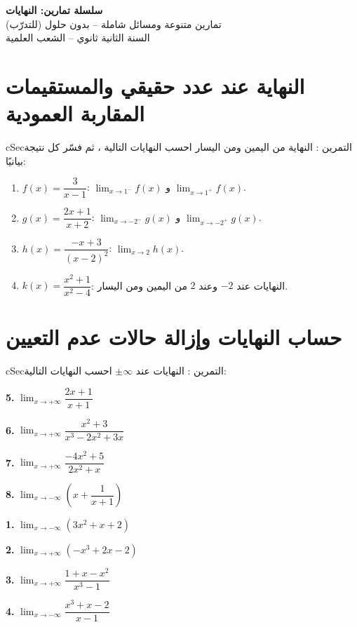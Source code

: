 \documentclass[12pt,a4paper]{article}
\newenvironment{BOX}[2]{\begin{otherlanguage}{english}\begin{arbox}{#1}{#2}}{\end{arbox}\end{otherlanguage}}
\newcounter{exo}
\newenvironment{tamrin}[1]{\stepcounter{exo}\begin{BOX}{cSec}{التمرين \theexo: #1}}{\end{BOX}}
\newenvironment{LTR}{\begin{otherlanguage}{english}}{\end{otherlanguage}}
\newcommand{\TwoCol}[4]{\par\begin{LTR}\noindent\begin{minipage}[t]{#1\textwidth}\selectlanguage{arabic}#2\end{minipage}\hfill\begin{minipage}[t]{#3\textwidth}\selectlanguage{arabic}#4\end{minipage}\end{LTR}\par}
\newcommand{\RL}[4]{\TwoCol{#3}{#4}{#1}{#2}}  %
\newcommand{\Lm}[1]{\displaystyle\lim_{x\to#1}}
\begin{document}
\begin{LTR}
\begin{tcolorbox}[enhanced,colback=cSec!10,colframe=cSec!40,arc=3mm,halign=center,boxrule=0.6pt,top=12pt,bottom=12pt,before upper={\selectlanguage{arabic}}]
{\color{cSec}\fontsize{28}{34}\selectfont\bfseries سلسلة تمارين: النهايات}\\[8pt]
{\color{cSec!80!black}\large تمارين متنوعة ومسائل شاملة -- بدون حلول (للتدرّب)}\\[5pt]
{\color{cSec!80!black}\large السنة الثانية ثانوي -- الشعب العلمية}
\end{tcolorbox}
\end{LTR}

\section{النهاية عند عدد حقيقي والمستقيمات المقاربة العمودية}
\begin{tamrin}{النهاية من اليمين ومن اليسار}
احسب النهايات التالية ، ثم فسّر كل نتيجة بيانيًا:
\begin{enumerate}
\item $f(x)=\dfrac3{x-1}$: \quad $\Lm{1^-}f(x)$ و $\Lm{1^+}f(x)$.
\item $g(x)=\dfrac{2x+1}{x+2}$: \quad $\Lm{-2^-}g(x)$ و $\Lm{-2^+}g(x)$.
\item $h(x)=\dfrac{-x+3}{(x-2)^2}$: \quad $\Lm{2}h(x)$.
\item $k(x)=\dfrac{x^2+1}{x^2-4}$: \quad النهايات عند $-2$ وعند $2$ من اليمين ومن اليسار.
\end{enumerate}
\end{tamrin}

\section{حساب النهايات وإزالة حالات عدم التعيين}
\begin{tamrin}{النهايات عند $\pm\infty$}
احسب النهايات التالية:\par
\RL{0.48}{\textbf{1.} $\Lm{-\infty}\left(3x^2+x+2\right)$\par \textbf{2.} $\Lm{+\infty}\left(-x^3+2x-2\right)$\par \textbf{3.} $\Lm{+\infty}\dfrac{1+x-x^2}{x^3-1}$\par \textbf{4.} $\Lm{-\infty}\dfrac{x^3+x-2}{x-1}$}{0.48}{\textbf{5.} $\Lm{+\infty}\dfrac{2x+1}{x+1}$\par \textbf{6.} $\Lm{+\infty}\dfrac{x^2+3}{x^3-2x^2+3x}$\par \textbf{7.} $\Lm{+\infty}\dfrac{-4x^2+5}{2x^2+x}$\par \textbf{8.} $\Lm{-\infty}\left(x+\dfrac1{x+1}\right)$}
\end{tamrin}
\end{document}
